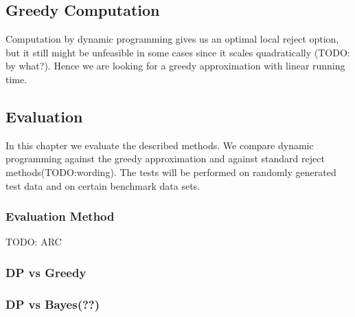 \subsection{Greedy Computation}
Computation by dynamic programming gives us an optimal local reject option, but it still might be unfeasible in some cases since it scales quadratically (TODO: by what?). Hence we are looking for a greedy approximation with linear running time. 

\subsection{Evaluation}
In this chapter we evaluate the described methods. We compare dynamic programming against the greedy approximation and against standard reject methods(TODO:wording). The tests will be performed on randomly generated test data and on certain benchmark data sets.

\subsubsection{Evaluation Method}
TODO: ARC

\subsubsection{DP vs Greedy}

\subsubsection{DP vs Bayes(??)}